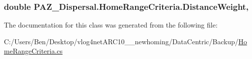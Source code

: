 \hypertarget{class_p_a_z___dispersal_1_1_home_range_criteria_a8213178ab0bcc15dadc5039ed7f4c2dc}{
\subsubsection[{Distance\-Weight}]{\setlength{\rightskip}{0pt plus 5cm}double P\-A\-Z\-\_\-\-Dispersal.\-Home\-Range\-Criteria.\-Distance\-Weight\hspace{0.3cm}{\ttfamily [get]}, {\ttfamily [set]}}}\label{class_p_a_z___dispersal_1_1_home_range_criteria_a8213178ab0bcc15dadc5039ed7f4c2dc}


The documentation for this class was generated from the following file\-:\begin{DoxyCompactItemize}
\item 
C\-:/\-Users/\-Ben/\-Desktop/vlog4net\-A\-R\-C10\-\_\-\_\-newhoming/\-Data\-Centric/\-Backup/\hyperlink{_backup_2_home_range_criteria_8cs}{Home\-Range\-Criteria.\-cs}\end{DoxyCompactItemize}
